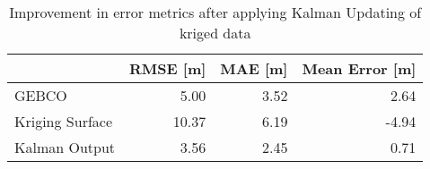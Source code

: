 \begin{table}
\centering
\caption{Improvement in error metrics after applying Kalman Updating of kriged data}
\label{tab:oahu1_gebco_raster_error}
\begin{tabular}{lrrr}
\toprule
 & RMSE [m] & MAE [m] & Mean Error [m] \\
\midrule
GEBCO & 5.00 & 3.52 & 2.64 \\
Kriging Surface & 10.37 & 6.19 & -4.94 \\
Kalman Output & 3.56 & 2.45 & 0.71 \\
\bottomrule
\end{tabular}
\end{table}
